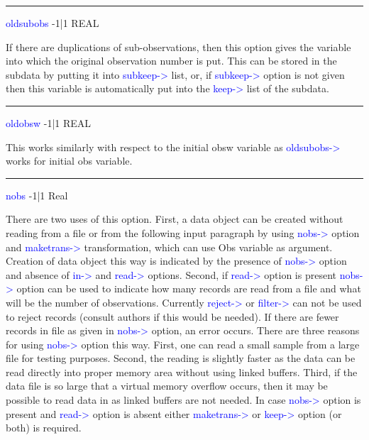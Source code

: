 \vspace{0.3cm}
\hrule
\vspace{0.3cm}
\noindent \textcolor{blue}{oldsubobs} \tabto{3cm} -1|1 \tabto{5cm}   REAL \tabto{7cm}
\begin{changemargin}{3cm}{0cm}
\noindent  If there are duplications of sub-observations, then this option gives the variable
into which the original observation number is put. This can be stored in the
subdata by putting it into \textcolor{blue}{subkeep->} list, or, if \textcolor{blue}{subkeep->} option is not given
then this variable is automatically put into the \textcolor{blue}{keep->} list of the subdata.

\end{changemargin}
\vspace{0.3cm}
\hrule
\vspace{0.3cm}
\noindent \textcolor{blue}{oldobsw} \tabto{3cm} -1|1 \tabto{5cm}  REAL \tabto{7cm}
\begin{changemargin}{3cm}{0cm}
\noindent  This works similarly with respect to the initial obsw variable as \textcolor{blue}{oldsubobs->}
works for initial obs variable.

\end{changemargin}
\vspace{0.3cm}
\hrule
\vspace{0.3cm}
\noindent \textcolor{blue}{nobs} \tabto{3cm} -1|1 \tabto{5cm}  Real \tabto{7cm}
\begin{changemargin}{3cm}{0cm}
\noindent  There are two uses of this option. First, a data object can be created without reading
from a file or from the following input paragraph by using \textcolor{blue}{nobs->} option and
\textcolor{blue}{maketrans->} transformation, which can use Obs variable as argument. Creation
of data object this way is indicated by the presence of \textcolor{blue}{nobs->} option and absence
of \textcolor{blue}{in->} and \textcolor{blue}{read->} options. Second, if \textcolor{blue}{read->} option is present \textcolor{blue}{nobs->}
option can be used to indicate how many records are read from a file and what
will be the number of observations. Currently \textcolor{blue}{reject->} or \textcolor{blue}{filter->} can not
be used to reject records (consult authors if this would be needed). If there are
fewer records in file as given in \textcolor{blue}{nobs->} option, an error occurs. There are three
reasons for using \textcolor{blue}{nobs->} option this way. First, one can read a small sample
from a large file for testing purposes. Second, the reading is slightly faster as the
data can be read directly into proper memory area without using linked buffers.
Third, if the data file is so large that a virtual memory overflow occurs, then it may
be possible to read data in as linked buffers are not needed.
In case \textcolor{blue}{nobs->} option is present and \textcolor{blue}{read->} option is absent either
\textcolor{blue}{maketrans->} or \textcolor{blue}{keep->} option (or both) is required.
\end{changemargin}
